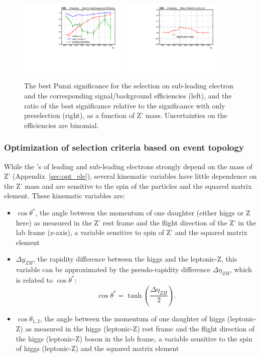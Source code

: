 \begin{figure}[htbp]
   \centering
   \includegraphics[width=0.45\textwidth]{optimization/plot_2nd_pt/plot_2nd_pt_best_cut_significance_and_efficiency.pdf}
   \includegraphics[width=0.45\textwidth]{optimization/plot_2nd_pt/plot_2nd_pt_significance_ratio_of_best_cut_to_no_cut.pdf}
   \caption{The best Punzi significance for the selection on 
sub-leading electron \pt and the corresponding signal/background 
efficiencies (left), and the ratio of the best significance 
relative to the significance with only preselection (right),  as a function 
of Z' mass. Uncertainties on the efficiencies are binomial.}
  \label{fig:subptmass}
\end{figure}



\subsubsection*{Optimization of selection criteria based on event topology \label{sec:opt_topo}}
 While the \pt's of leading and sub-leading electrons 
strongly depend on the mass of Z' (Appendix~\ref{sec:opt_ele}), several 
kinematic variables have little dependence on the Z' mass and are sensitive to 
the spin of the particles and the squared matrix element. These kinematic 
variables are: 
 \begin{itemize}
 \item $\cos{\theta^*}$, the angle between the momentum of one daughter 
(either higgs or Z here) as measured in the Z' rest frame and the flight 
direction of the Z' in the lab frame (z-axis), a variable sensitive to spin 
of Z' and the squared matrix element 
 \item $\Delta y_{ZH}$, the rapidity difference between the higgs and the 
leptonic-Z, this variable can be approximated by the pseudo-rapidity 
difference $\Delta \eta_{ZH}$, which is related to $\cos{\theta^*}$: 
\[
\cos{\theta^*}=\tanh{\left(\frac{\Delta \eta_{ZH}}{2}\right)}.
\]
 \item $\cos{\theta_{1,2}}$, the angle between the momentum of one daughter of 
higgs (leptonic-Z) as measured in the higgs (leptonic-Z) rest 
frame and the flight direction of the higgs (leptonic-Z) boson in the lab 
frame, a variable sensitive to the spin of higgs (leptonic-Z) and 
the squared matrix element 
 \end{itemize}

